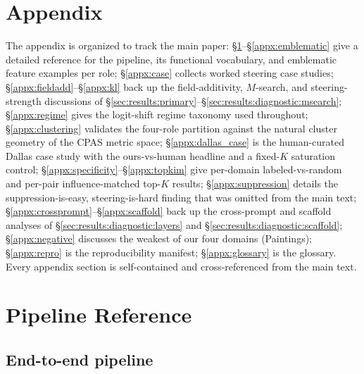 \section*{Appendix}

The appendix is organized to track the main paper: \S\ref{appx:pipeline}--\S\ref{appx:emblematic} give a detailed reference for the pipeline, its functional vocabulary, and emblematic feature examples per role; \S\ref{appx:case} collects worked steering case studies; \S\ref{appx:fieldadd}--\S\ref{appx:kl} back up the field-additivity, $M$-search, and steering-strength discussions of \S\ref{sec:results:primary}--\S\ref{sec:results:diagnostic:msearch}; \S\ref{appx:regime} gives the logit-shift regime taxonomy used throughout; \S\ref{appx:clustering} validates the four-role partition against the natural cluster geometry of the CPAS metric space; \S\ref{appx:dallas_case} is the human-curated Dallas case study with the ours-vs-human headline and a fixed-$K$ saturation control; \S\ref{appx:specificity}--\S\ref{appx:topkim} give per-domain labeled-vs-random and per-pair influence-matched top-$K$ results; \S\ref{appx:suppression} details the suppression-is-easy, steering-is-hard finding that was omitted from the main text; \S\ref{appx:crossprompt}--\S\ref{appx:scaffold} back up the cross-prompt and scaffold analyses of \S\ref{sec:results:diagnostic:layers} and \S\ref{sec:results:diagnostic:scaffold}; \S\ref{appx:negative} discusses the weakest of our four domains (Paintings); \S\ref{appx:repro} is the reproducibility manifest; \S\ref{appx:glossary} is the glossary. Every appendix section is self-contained and cross-referenced from the main text.

\section{Pipeline Reference}
\label{appx:pipeline}

\subsection{End-to-end pipeline}

